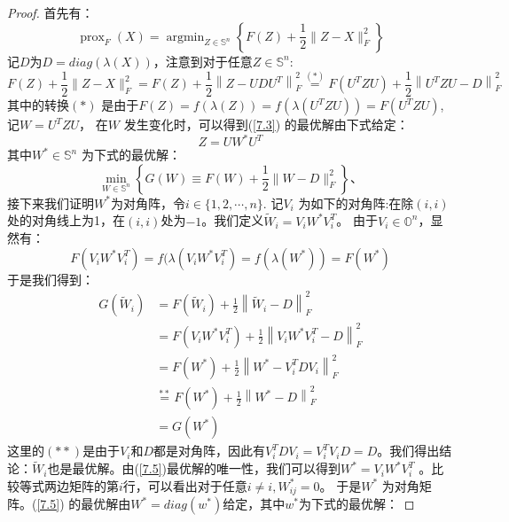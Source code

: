 \documentclass[fontset=mac]{ctexart}
\begin{document}
	\begin{proof}
		首先有：
		\begin{equation}
			\operatorname{prox}_{F}({X})=\operatorname{argmin}_{{Z} \in \mathbb{S}^{n}}\left\{F({Z})+\frac{1}{2}\|{Z}-{X}\|_{F}^{2}\right\} \label{7.3}
		\end{equation}
		记$D$为$D=diag(\lambda(X))$，注意到对于任意$Z \in \mathbb{S}^n$:
		\begin{equation}
			F({Z})+\frac{1}{2}\|{Z}-{X}\|_{F}^{2}=F({Z})+\frac{1}{2}\left\|{Z}-{U} {D} {U}^{T}\right\|_{F}^{2} \stackrel{(*)}{=} F\left({U}^{T} {Z} {U}\right)+\frac{1}{2}\left\|{U}^{T} {Z} {U}-{D}\right\|_{F}^{2}
		\end{equation}
		其中的转换$(*)$ 是由于$F(Z)=f(\lambda(Z))=f(\lambda(U^TZU))=F(U^TZU)$, 记$W = U^TZU$， 在$W$ 发生变化时，可以得到(\ref{7.3}) 的最优解由下式给定：
		\begin{equation}
			Z = UW^*U^T \label{7.4}
		\end{equation}
		其中$W^* \in \mathbb{S}^n$ 为下式的最优解：
		\begin{equation}
			\min _{{W} \in \mathbb{S}^{n}}\left\{G({W}) \equiv F({W})+\frac{1}{2}\|{W}-{D}\|_{F}^{2}\right\}、\label{7.5}
		\end{equation}
		接下来我们证明$W^*$为对角阵，令$i \in \{1,2,\cdots,n\}$. 记$V_i$ 为如下的对角阵:在除$(i,i)$处的对角线上为1，在$(i,i)$处为$-1$。我们定义$\widetilde{{W}}_{i}={V}_{i} {W}^{*} {V}_{i}^{T}$。 由于$V_i \in \mathbb{O}^n$，显然有：
		\begin{equation}
			F(V_iW^*V_i^T) = f(\lambda(V_iW^*V_i^T) = f(\lambda(W^*)) =F(W^*)
		\end{equation}
		于是我们得到：
		\begin{equation}
			\begin{aligned}
				G\left(\widetilde{{W}}_{i}\right) &=F\left(\widetilde{{W}}_{i}\right)+\frac{1}{2}\left\|\widetilde{{W}}_{i}-{D}\right\|_{F}^{2} \\
				&=F\left({V}_{i} {W}^{*} {V}_{i}^{T}\right)+\frac{1}{2}\left\|{V}_{i} {W}^{*} {V}_{i}^{T}-{D}\right\|_{F}^{2} \\
				&=F\left({W}^{*}\right)+\frac{1}{2}\left\|{W}^{*}-{V}_{i}^{T} {D} {V}_{i}\right\|_{F}^{2} \\
				& \stackrel{* *}{=} F\left({W}^{*}\right)+\frac{1}{2}\left\|{W}^{*}-{D}\right\|_{F}^{2} \\
				&=G\left({W}^{*}\right)
			\end{aligned}
		\end{equation}
		这里的$(**)$是由于$V_i$和$D$都是对角阵，因此有$V_i^TDV_i = V_i^TV_iD=D$。我们得出结论：$\widetilde{{W}}_i$也是最优解。由(\ref{7.5})最优解的唯一性，我们可以得到$W^* = V_iW^*V_i^T$ 。比较等式两边矩阵的第$i$行，可以看出对于任意$i \ne i, W^*_{ij}=0$。 于是$W^*$ 为对角矩阵。(\ref{7.5}) 的最优解由$W^* = diag(w^*)$给定，其中$w^*$为下式的最优解：

\end{proof}
\end{document}
